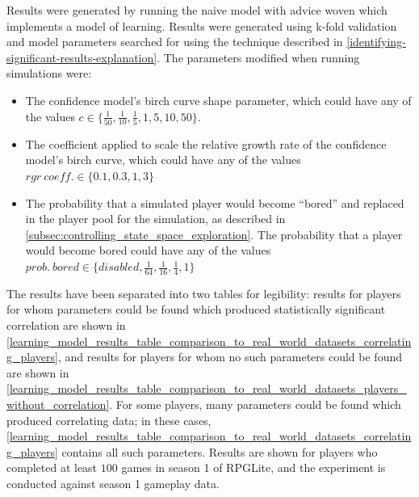 Results were generated by running the naive model with advice woven which implements a
model of learning. Results were generated using k-fold validation and model
parameters searched for using the technique described in
\cref{identifying-significant-results-explanation}. The parameters modified when
running simulations were:

\begin{itemize}
  \item The confidence model's birch curve shape parameter, which could have any
  of the values $c \in \{\frac{1}{50}, \frac{1}{10},
    \frac{1}{5}, 1, 5, 10, 50\}$.
    \item The coefficient applied to scale the relative growth rate of the
    confidence model's birch curve, which could have any of the values $rgr
    ~ coeff. \in \{0.1, 0.3, 1, 3\}$
    \item The probability that a simulated player would become ``bored'' and
    replaced in the player pool for the simulation, as described in
    \cref{subsec:controlling_state_space_exploration}. The probability that a
    player would become bored could have any of the values $prob.~bored \in
    \{disabled, \frac{1}{64}, \frac{1}{16}, \frac{1}{4}, 1\}$
\end{itemize}

The results have been separated into two tables for
legibility: results for players for whom parameters could be found which produced statistically
significant correlation are shown in 
\cref{learning_model_results_table_comparison_to_real_world_datasets_correlating_players},
and results for players for whom no such parameters could be found are shown in
\cref{learning_model_results_table_comparison_to_real_world_datasets_players_without_correlation}.
For some players, many parameters could be found which produced correlating
data; in these cases,
\cref{learning_model_results_table_comparison_to_real_world_datasets_correlating_players}
contains all such parameters. Results
are shown for players who completed at least $100$ games in season 1 of RPGLite,
and the experiment is conducted against season 1 gameplay data.



